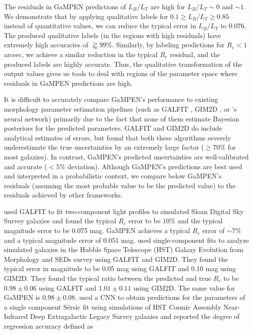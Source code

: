 \documentclass[twocolumn]{aastex63}
\newcommand\sersic{S\'ersic}
\newcommand\gampen{GaMPEN}
\begin{document}
\begin{CJK*}{UTF8}{gbsn}
The residuals in \gampen{} predictions of $L_B/L_T$ are high for $L_B/L_T \sim 0$ and $\sim 1$. We demonstrate that by applying qualitative labels for $0.1 \geq L_B/L_T \geq 0.85$ instead of quantitative values, we can reduce the typical error in $L_B/L_T$ to $0.076$. The produced qualitative labels (in the regions with high residuals) have extremely high accuracies of $\gtrapprox99\%$. Similarly, by labeling predictions for $R_e < 1$ arcsec, we achieve a similar reduction in the typical $R_e$ residual, and the produced labels are highly accurate. Thus, the qualitative transformation of the output values gives us tools to deal with regions of the parameter space where residuals in \gampen{} predictions are high.

It is difficult to accurately compare \gampen{}'s performance to existing morphology parameter estimation pipelines (such as GALFIT \citep{galfit}, GIM2D \citep{gim2d}, or \citet{Tuccillo2018DeepFitting}'s neural network) primarily due to the fact that none of them estimate Bayesian posteriors for the predicted parameters. GALFIT and GIM2D do include analytical estimates of errors, but \citet{haussler_07} found that both these algorithms severely underestimate the true uncertainties by an extremely large factor ($\geq 70\%$ for most galaxies). In contrast, \gampen{}'s predicted uncertainties are well-calibrated and accurate ($<5\%$ deviation). Although \gampen{}'s predictions are best used and interpreted in a probabilistic context, we compare below \gampen{}'s residuals (assuming the most probable value to be the predicted value) to the residuals achieved by other frameworks.

\citet{meert_13} used GALFIT to fit two-component light profiles to simulated Sloan Digital Sky Survey \citep[SDSS; ][]{sdss_tech_summary} galaxies and found the typical $R_e$ error to be $10\%$ and the typical magnitude error to be 0.075 mag. \gampen{} achieves a typical $R_e$ error of $\sim7\%$ and a typical magnitude error of 0.051 mag. \citet{haussler_07} used single-component fits to analyze simulated galaxies in the Hubble Space Telescope (HST) Galaxy Evolution from Morphology and SEDs \citep[GEMS; ][]{gems} survey  using GALFIT and GIM2D. They found the typical error in magnitude to be 0.05 mag using GALFIT and 0.10 mag using GIM2D. They found the typical ratio between the predicted and true $R_e$ to be $0.98\pm0.06$ using GALFIT and $1.01 \pm 0.11$ using GIM2D. The same value for \gampen{} is $0.98\pm0.08$. \citet{Tuccillo2018DeepFitting} used a CNN to obtain predictions for the parameters of a single component \sersic{} fit using simulations of HST Cosmic Assembly Near-Infrared Deep Extragalactic Legacy Survey \citep[CANDELS; ][]{candels_1} galaxies  and reported the degree of regression accuracy defined as


\end{CJK*}
\end{document}
